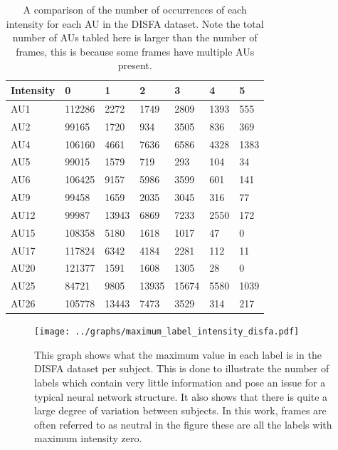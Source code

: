     \begin{table}[h!]
    \centering

    \begin{tabular}{lllllll}
    \hline
    Intensity & 0      & 1     & 2     & 3     & 4    & 5    \\ \hline
    AU1       & 112286 & 2272  & 1749  & 2809  & 1393 & 555  \\
    AU2       & 99165  & 1720  & 934   & 3505  & 836  & 369  \\
    AU4       & 106160 & 4661  & 7636  & 6586  & 4328 & 1383 \\
    AU5       & 99015  & 1579  & 719   & 293   & 104  & 34   \\
    AU6       & 106425 & 9157  & 5986  & 3599  & 601  & 141  \\
    AU9       & 99458  & 1659  & 2035  & 3045  & 316  & 77   \\
    AU12      & 99987  & 13943 & 6869  & 7233  & 2550 & 172  \\
    AU15      & 108358 & 5180  & 1618  & 1017  & 47   & 0    \\
    AU17      & 117824 & 6342  & 4184  & 2281  & 112  & 11   \\
    AU20      & 121377 & 1591  & 1608  & 1305  & 28   & 0    \\
    AU25      & 84721  & 9805  & 13935 & 15674 & 5580 & 1039 \\
    AU26      & 105778 & 13443 & 7473  & 3529  & 314  & 217  \\ \hline
    \end{tabular}
    \caption{A comparison of the number of occurrences of each intensity for each AU in the DISFA dataset. Note the total number
    of AUs tabled here is larger than the number of frames, this is because some frames have multiple AUs present.} \label{compau}
    \end{table}


    \begin{figure}[h!]
      \texttt{[image: ../graphs/maximum\_label\_intensity\_disfa.pdf]}
      \caption{This graph shows what the maximum value in each label is in the DISFA dataset per subject. This
      is done to illustrate the number of labels which contain very little information
      and pose an issue for a typical neural network structure. It also shows that there
      is quite a large degree of variation between subjects. In this work, frames are often referred to as neutral
      in the figure these are all the labels with maximum intensity zero.}\label{disfastats}
    \end{figure}

